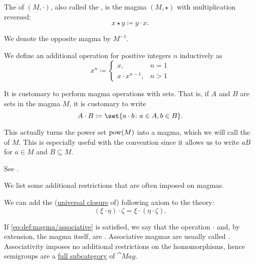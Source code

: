 \begin{definition}
\begin{thmenum}[series=def:magma]
     The  of \( (M, \cdot) \), also called the , is the magma \( (M, \star) \) with multiplication reversed:
    \begin{equation*}
      x \star y \coloneqq y \cdot x.
    \end{equation*}

    We denote the opposite magma by \( M^{-1} \).

     We define an additional  operation for positive integers \( n \) inductively as
    \begin{equation}\label{eq:def:magma/exponentiation}
      x^n \coloneqq \begin{cases}
        x,               & n = 1 \\
        x \cdot x^{n-1}, & n > 1
      \end{cases}
    \end{equation}

     It is customary to perform magma operations with sets. That is, if \( A \) and \( B \) are sets in the magma \( M \), it is customary to write
    \begin{equation*}
      A \cdot B \coloneqq \set{ a \cdot b \colon a \in A, b \in B }.
    \end{equation*}

    This actually turns the power set \( \operatorname{pow}(M) \) into a magma, which we will call the  of \( M \). This is especially useful with the convention  since it allows us to write \( aB \) for \( a \in M \) and \( B \subseteq M \).

    See .
  \end{thmenum}

  We list some additional restrictions that are often imposed on magmas.
  \begin{thmenum}[resume=def:magma]
     We can add the (\hyperref[thm:implicit_universal_quantification]{universal closure} of) following axiom to the theory:
    \begin{equation}\label{eq:def:magma/associative}
      (\xi \cdot \eta) \cdot \zeta = \xi \cdot (\eta \cdot \zeta).
    \end{equation}

    If \eqref{eq:def:magma/associative} is satisfied, we say that the operation \( \cdot \) and, by extension, the magma itself, are . Associative magmas are usually called . Associativity imposes no additional restrictions on the homomorphisms, hence semigroups are a \hyperref[def:subcategory]{full subcategory} of \( \cat{Mag} \).


\end{thmenum}
\end{definition}
